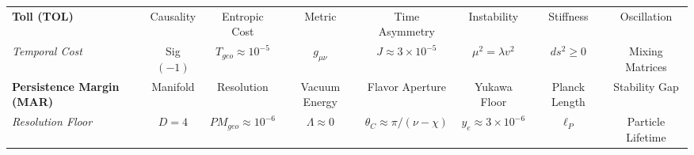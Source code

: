 \begin{table}[t]
{\begin{tabular}{@{}lccccccc@{}}
\textbf{Toll (TOL)} & Causality & Entropic Cost & Metric & Time Asymmetry & Instability & Stiffness & Oscillation \\
\textit{Temporal Cost} & Sig $(-1)$ & $T_{geo} \approx 10^{-5}$ & $g_{\mu\nu}$ & $J \approx 3 \times 10^{-5}$ & $\mu^2 = \lambda v^2$ & $ds^2 \ge 0$ & Mixing Matrices \\ \addlinespace
\textbf{Persistence Margin (MAR)} & Manifold & Resolution & Vacuum Energy & Flavor Aperture & Yukawa Floor & Planck Length & Stability Gap \\
\textit{Resolution Floor} & $D = 4$ & $PM_{geo} \approx 10^{-6}$ & $\Lambda \approx 0$ & $\theta_C \approx \pi/(\nu-\chi)$ & $y_e \approx 3 \times 10^{-6}$ & $\ell_P$ & Particle Lifetime \\ \bottomrule
\end{tabular}%
}
\end{table}
